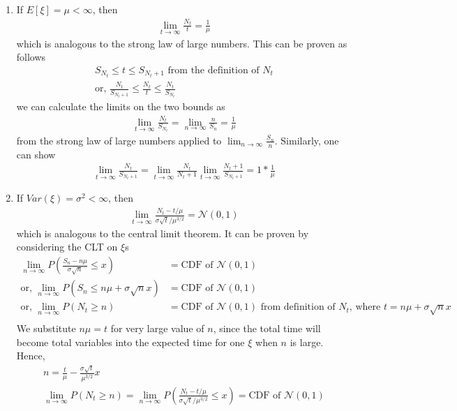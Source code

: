 \documentclass[../probability-notes.tex]{subfiles}
\begin{document}
    \begin{enumerate}
        \item If $E[\xi] = \mu < \infty$, then
        \begin{align*}
            \lim_{t \to \infty} \frac{N_{t}}{t} = \frac{1}{\mu}
        \end{align*}
        which is analogous to the strong law of large numbers. This can be proven as follows
        \begin{align*}
            S_{N_{t}} \leq t \leq S_{N_{t} + 1} \text{ from the definition of $N_{t}$}\\
            \text{or, } \frac{N_{t}}{S_{N_{t} + 1}} \leq \frac{N_{t}}{t} \leq \frac{N_{t}}{S_{N_{t}}}
        \end{align*}
        we can calculate the limits on the two bounds as
        \begin{align*}
            \lim_{t \to \infty} \frac{N_{t}}{S_{N_{t}}} = \lim_{n \to \infty} \frac{n}{S_{n}} = \frac{1}{\mu}
        \end{align*}
        from the strong law of large numbers applied to $\lim_{n \to \infty} \frac{S_{n}}{n}$. Similarly, one can show
        \begin{align*}
            \lim_{t \to \infty} \frac{N_{t}}{S_{N_{t} + 1}} = \lim_{t \to \infty} \frac{N_{t}}{N_{t} + 1} \lim_{t \to \infty} \frac{N_{t} + 1}{S_{N_{t} + 1}} = 1 * \frac{1}{\mu}
        \end{align*}

        \item If $Var(\xi) = \sigma^{2} < \infty$, then
        \begin{align*}
            \lim_{t \to \infty} \frac{N_{t} - t/\mu}{\sigma \sqrt{t}/\mu^{3/2}} = \mathcal{N}(0,1)
        \end{align*}
        which is analogous to the central limit theorem. It can be proven by considering the CLT on $\xi$s
        \begin{align*}
            \lim_{n \to \infty} P(\frac{S_{n} - n\mu}{\sigma \sqrt{n}} \leq x) &= \text{CDF of }\mathcal{N}(0,1)\\
            \text{or, } \lim_{n \to \infty} P(S_{n} \leq n\mu + \sigma \sqrt{n} x) &= \text{CDF of }\mathcal{N}(0,1)\\
            \text{or, } \lim_{n \to \infty} P(N_{t} \geq n) &= \text{CDF of }\mathcal{N}(0,1) \text{ from definition of $N_{t}$, where $t = n\mu + \sigma \sqrt{n} x$}\\
        \end{align*}
        We substitute $n\mu = t$ for very large value of $n$, since the total time will become total variables into the expected time for one $\xi$ when $n$ is large. Hence,
        \begin{gather*}
            n = \frac{t}{\mu} - \frac{\sigma \sqrt{t}}{\mu^{3/2}}x\\
            \lim_{n \to \infty} P(N_{t} \geq n) = \lim_{n \to \infty} P(\frac{N_{t} - t/\mu}{\sigma \sqrt{t}/\mu^{3/2}} \leq x) = \text{CDF of }\mathcal{N}(0,1)
        \end{gather*}
    \end{enumerate}
\end{document}
